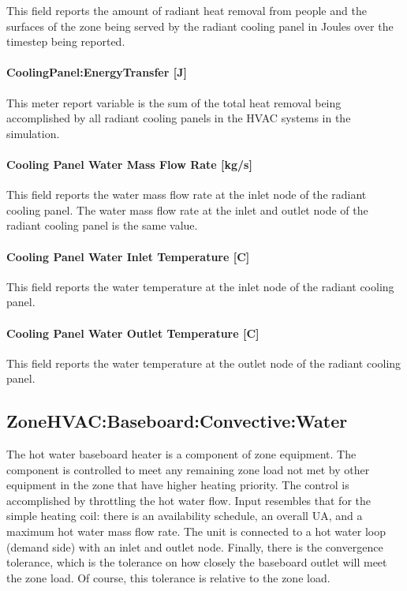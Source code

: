 This field reports the amount of radiant heat removal from people and the surfaces of the zone being served by the radiant cooling panel in Joules over the timestep being reported.

\paragraph{CoolingPanel:EnergyTransfer [J]}\label{coolingpanel-energytransfer-j}

This meter report variable is the sum of the total heat removal being accomplished by all radiant cooling panels in the HVAC systems in the simulation.

\paragraph{Cooling Panel Water Mass Flow Rate [kg/s]}\label{cooling-panel-water-mass-flow-rate-kgs}

This field reports the water mass flow rate at the inlet node of the radiant cooling panel.  The water mass flow rate at the inlet and outlet node of the radiant cooling panel is the same value.

\paragraph{Cooling Panel Water Inlet Temperature [C]}\label{cooling-panel-water-inlet-temperature-c}

This field reports the water temperature at the inlet node of the radiant cooling panel.

\paragraph{Cooling Panel Water Outlet Temperature [C]}\label{cooling-panel-water-outlet-temperature-c}

This field reports the water temperature at the outlet node of the radiant cooling panel.

\subsection{ZoneHVAC:Baseboard:Convective:Water}\label{zonehvacbaseboardconvectivewater}

The hot water baseboard heater is a component of zone equipment. The component is controlled to meet any remaining zone load not met by other equipment in the zone that have higher heating priority. The control is accomplished by throttling the hot water flow. Input resembles that for the simple heating coil: there is an availability schedule, an overall UA, and a maximum hot water mass flow rate. The unit is connected to a hot water loop (demand side) with an inlet and outlet node. Finally, there is the convergence tolerance, which is the tolerance on how closely the baseboard outlet will meet the zone load. Of course, this tolerance is relative to the zone load.

